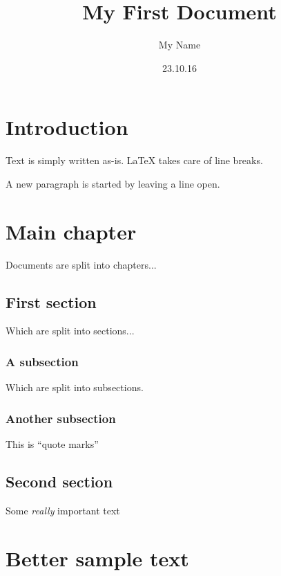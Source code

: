 \documentclass[a4paper]{report}
\title{My First Document}
\author{My Name}
\date{23.10.16}
\begin{document}
\maketitle
\tableofcontents

\chapter{Introduction}
Text is simply written as-is.
\LaTeX{} takes care of line breaks.

A new paragraph is started by leaving a line open.

\chapter{Main chapter}
Documents are split into chapters...

\section{First section}
Which are split into sections...

\subsection{A subsection}
Which are split into subsections.

\subsection{Another subsection}
This is ``quote marks''

\section{Second section}
Some \emph{really} important text

\chapter{Better sample text}
\lipsum
\end{document}
